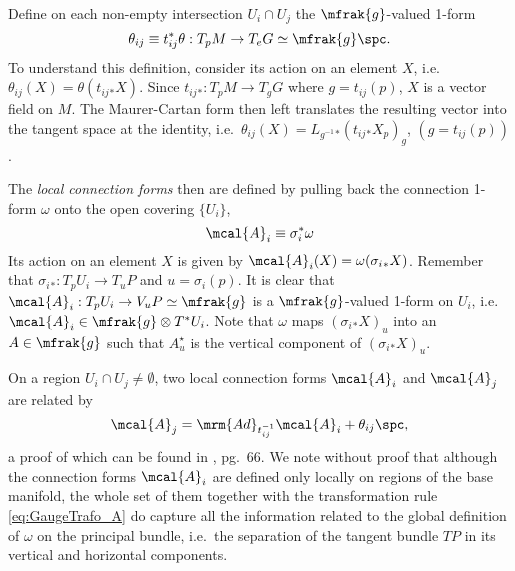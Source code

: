 \documentclass[10pt,reqno]{amsart}
\numberwithin{equation}{section}
\begin{document}
Define on each non-empty intersection $U_i \cap U_j$ the 
$\mfrak{g}$-valued 1-form
%
\begin{equation}
	\theta_{ij} \equiv t_{ij}^\ast \theta : T_pM \rightarrow T_eG 
	\simeq \mfrak{g} \spc.
\end{equation}
%
To understand this definition, consider its action on an element 
$X$, i.e.\ $\theta_{ij}(X) = \theta(t_{ij}{}_\ast X)$. Since 
$t_{ij}{}_\ast: T_pM \rightarrow T_gG$ where $g = t_{ij}(p)$, $X$ 
is a vector field on $M$. The Maurer-Cartan form then left 
translates the resulting vector into the tangent space at the 
identity, i.e.\ $\theta_{ij}(X) = L_{g^{-1}}{}_\ast 
(t_{ij}{}_\ast X_p)_g$, $(g = t_{ij}(p))$.

The \emph{local connection forms} then are defined by pulling 
back the connection 1-form $\omega$ onto the open covering 
$\{U_i\}$,
%
\begin{equation}
	\mcal{A}_i \equiv \sigma_i^\ast \omega
\end{equation}
%
Its action on an element $X$ is given by $\mcal{A}_i (X) = 
\omega(\sigma_i{}_\ast X)$. Remember that $\sigma_i{}_\ast : 
T_pU_i \rightarrow T_uP$ and $u = \sigma_i(p)$. It is clear that 
$\mcal{A}_i : T_pU_i \rightarrow V_uP \simeq \mfrak{g}$ is a 
$\mfrak{g}$-valued 1-form on $U_i$, i.e.\ $\mcal{A}_i \in 
\mfrak{g} \otimes T^\ast U_i$.  Note that $\omega$ maps 
$(\sigma_i{}_\ast X)_u$ into an $A \in \mfrak{g}$ such that 
$A_u^\star$ is the vertical component of $(\sigma_i{}_\ast X)_u$.

On a region $U_i \cap U_j \neq \emptyset$, two local connection 
forms $\mcal{A}_i$ and $\mcal{A}_j$ are related by
%
\begin{equation}\label{eq:GaugeTrafo_A}
	\mcal{A}_j = \mrm{Ad}_{t_{ij}^{-1}} \mcal{A}_i + 
	\theta_{ij}\spc,
\end{equation}
%
a proof of which can be found in \cite{kob1996found}, pg.\ 66. We 
note without proof that although the connection forms 
$\mcal{A}_i$ are defined only locally on regions of the base 
manifold, the whole set of them together with the transformation 
rule \eqref{eq:GaugeTrafo_A} do capture all the information 
related to the global definition of $\omega$ on the principal 
bundle, i.e.\ the separation of the tangent bundle $TP$ in its 
vertical and horizontal components.
\end{document}
